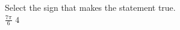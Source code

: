 \documentclass{ximera}
\author{David Kish}
\begin{document}
\begin{exercise}
Select the sign that makes the statement true.\\
$\frac{7\pi}{6}$ \wordChoice{\choice[correct]{$<$}\choice{$>$}\choice{$=$}} $4$ 

\end{exercise}
\end{document}
